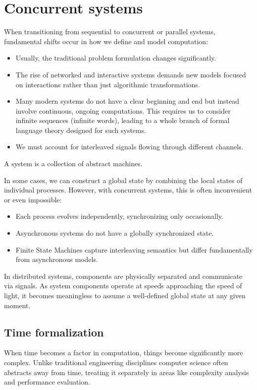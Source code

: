 \section{Concurrent systems}

When transitioning from sequential to concurrent or parallel systems, fundamental shifts occur in how we define and model computation:
\begin{itemize}
    \item Usually, the traditional problem formulation changes significantly.
    \item The rise of networked and interactive systems demands new models focused on interactions rather than just algorithmic transformations.
    \item Many modern systems do not have a clear beginning and end but instead involve continuous, ongoing computations.
        This requires us to consider infinite sequences (infinite words), leading to a whole branch of formal language theory designed for such systems.
    \item We must account for interleaved signals flowing through different channels.
\end{itemize}
\begin{definition}
    A system is a collection of abstract machines.
\end{definition}
In some cases, we can construct a global state by combining the local states of individual processes. 
However, with concurrent systems, this is often inconvenient or even impossible:
\begin{itemize}
    \item Each process evolves independently, synchronizing only occasionally.
    \item Asynchronous systems do not have a globally synchronized state.
    \item Finite State Machines capture interleaving semantics but differ fundamentally from asynchronous models.
\end{itemize}
\noindent In distributed systems, components are physically separated and communicate via signals.
As system components operate at speeds approaching the speed of light, it becomes meaningless to assume a well-defined global state at any given moment.

\subsection{Time formalization}
When time becomes a factor in computation, things become significantly more complex. 
Unlike traditional engineering disciplines computer science often abstracts away from time, treating it separately in areas like complexity analysis and performance evaluation.

